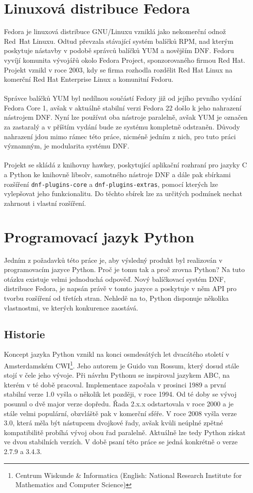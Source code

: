 \documentclass[
  field=inf,
  biblatex,
  glossaries,
  index
]{kidiplom}
\begin{document}
\section{Linuxová distribuce Fedora}
Fedora je linuxová distribuce GNU/Linuxu vzniklá jako nekomerční odnož Red~Hat Linuxu. Odtud převzala stávající systém balíčků RPM, nad kterým poskytuje nástavby v podobě správců balíčků YUM a novějším DNF. Fedoru vyvíjí komunita vývojářů okolo Fedora Project, sponzorovaného firmou Red Hat. Projekt vznikl v roce 2003, kdy se firma rozhodla rozdělit Red Hat Linux na komerční Red Hat Enterprise Linux a komunitní Fedoru.
\\
\\
Správce balíčků YUM byl nedílnou součástí Fedory již od jejího prvního vydání Fedora Core 1, avšak v aktuálně stabilní verzi Fedora 22 došlo k jeho nahrazení nástrojem DNF. Nyní lze používat oba nástroje paralelně, avšak YUM je označen za zastaralý a v příštím vydání bude ze systému kompletně odstraněn. Důvody nahrazení jdou mimo rámec této práce, nicméně jedním z nich, pro tuto práci významným, je modularita systému DNF.
\\
\\
Projekt se skládá z knihovny hawkey, poskytující aplikační rozhraní pro jazyky C a Python ke knihovně libsolv, samotného nástroje DNF a dále pak sbírkami rozšíření \texttt{dnf-plugins-core} a \texttt{dnf-plugins-extras}, pomocí kterých lze vylepšovat jeho funkcionalitu. Do těchto sbírek lze za určitých podmínek nechat zahrnout i vlastní rozšíření.

\newpage
\section{Programovací jazyk Python}
Jedním z požadavků této práce je, aby výsledný produkt byl realizován v programovacím jazyce Python. Proč je tomu tak a proč zrovna Python? Na tuto otázku existuje velmi jednoduchá odpověď. Nový balíčkovací systém DNF, distribuce Fedora, je napsán právě v tomto jazyce a poskytuje v něm API pro tvorbu rozšíření od třetích stran. Nehledě na to, Python disponuje několika vlastnostmi, ve kterých konkurence zaostává.

	\subsection{Historie}
	Koncept jazyka Python vznikl na konci osmdesátých let dvacátého století v Amsterdamském CWI\footnote{Centrum Wiskunde \& Informatica (English: National Research Institute for Mathematics and Computer Science)}. Jeho autorem je Guido van Rossum, který dosud stále stojí v čele jeho vývoje. Při návrhu Pythonu se inspiroval jazykem ABC, na kterém v té době pracoval. Implementace započala v prosinci 1989 a první stabilní verze 1.0 vyšla o několik let později, v roce 1994. Od té doby se vývoj posunul o dvě major verze dopředu. Řada 2.x.x odstartovala v roce 2000 a je stále velmi populární, obzvláště pak v komerční sféře.  V roce 2008 vyšla verze 3.0, která měla být nástupcem dvojkové řady, avšak kvůli neúplné zpětné kompatibilitě probíhá vývoj obou řad paralelně. Aktuálně lze tedy Python získat ve dvou stabilních verzích. V době psaní této práce se jedná konkrétně o verze 2.7.9 a 3.4.3.
\end{document}

